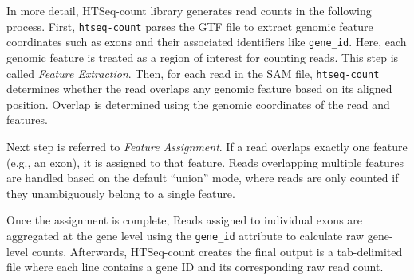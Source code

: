 In more detail, HTSeq-count library generates read counts in the following process. First, \texttt{htseq-count} parses the GTF file to extract genomic feature coordinates such as exons and their associated identifiers like \texttt{gene\_id}. Here, each genomic feature is treated as a region of interest for counting reads. This step is called \emph{Feature Extraction}. Then, for each read in the SAM file, \texttt{htseq-count} determines whether the read overlaps any genomic feature based on its aligned position. Overlap is determined using the genomic coordinates of the read and features.

Next step is referred to \emph{Feature Assignment}. If a read overlaps exactly one feature (e.g., an exon), it is assigned to that feature. Reads overlapping multiple features are handled based on the default “union” mode, where reads are only counted if they unambiguously belong to a single feature. 

Once the assignment is complete, Reads assigned to individual exons are aggregated at the gene level using the \texttt{gene\_id} attribute to calculate raw gene-level counts. Afterwards, HTSeq-count creates the final output is a tab-delimited file where each line contains a gene ID and its corresponding raw read count.

